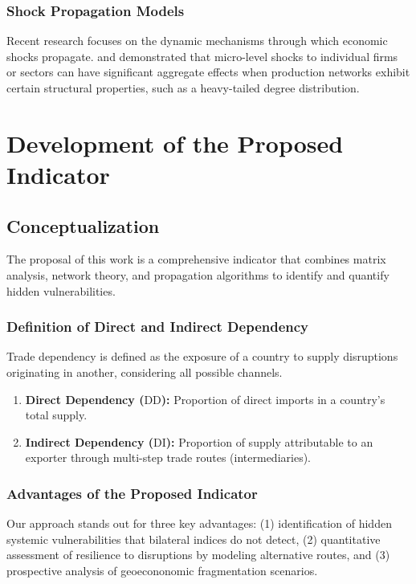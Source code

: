\documentclass[final,1p,times,authoryear]{elsarticle}
\providecommand{\DD}{\mathrm{DD}}
\providecommand{\DI}{\mathrm{DI}}
\begin{document}
\subsubsection{Shock Propagation Models}
Recent research focuses on the dynamic mechanisms through which economic shocks propagate. \cite{Acemoglu2012} and \cite{Carvalho2013} demonstrated that micro-level shocks to individual firms or sectors can have significant aggregate effects when production networks exhibit certain structural properties, such as a heavy-tailed degree distribution.

\section{Development of the Proposed Indicator}

\subsection{Conceptualization}
The proposal of this work is a comprehensive indicator that combines matrix analysis, network theory, and propagation algorithms to identify and quantify hidden vulnerabilities.

\subsubsection{Definition of Direct and Indirect Dependency}
Trade dependency is defined as the exposure of a country to supply disruptions originating in another, considering all possible channels.
\begin{enumerate}
    \item \textbf{Direct Dependency ($\DD$):} Proportion of direct imports in a country's total supply.
    \item \textbf{Indirect Dependency ($\DI$):} Proportion of supply attributable to an exporter through multi-step trade routes (intermediaries).
\end{enumerate}

\subsubsection{Advantages of the Proposed Indicator}
Our approach stands out for three key advantages: (1) identification of hidden systemic vulnerabilities that bilateral indices do not detect, (2) quantitative assessment of resilience to disruptions by modeling alternative routes, and (3) prospective analysis of geoecononomic fragmentation scenarios.
\end{document}
